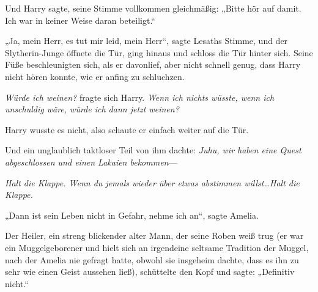 Und Harry sagte, seine Stimme vollkommen gleichmäßig: „Bitte hör auf damit. Ich war in keiner Weise daran beteiligt.“

„Ja, mein Herr, es tut mir leid, mein Herr“, sagte Lesaths Stimme, und der Slytherin-Junge öffnete die Tür, ging hinaus und schloss die Tür hinter sich. Seine Füße beschleunigten sich, als er davonlief, aber nicht schnell genug, dass Harry nicht hören konnte, wie er anfing zu schluchzen.

\emph{Würde ich weinen?} fragte sich Harry. \emph{Wenn ich nichts wüsste, wenn ich unschuldig wäre, würde ich dann jetzt weinen?}

Harry wusste es nicht, also schaute er einfach weiter auf die Tür.

Und ein unglaublich taktloser Teil von ihm dachte: \emph{Juhu, wir haben eine Quest abgeschlossen und einen Lakaien bekommen}—

\emph{Halt die Klappe. Wenn du jemals wieder über etwas abstimmen willst…Halt die Klappe.}


„Dann ist sein Leben nicht in Gefahr, nehme ich an“, sagte Amelia.

Der Heiler, ein streng blickender alter Mann, der seine Roben weiß trug (er war ein Muggelgeborener und hielt sich an irgendeine seltsame Tradition der Muggel, nach der Amelia nie gefragt hatte, obwohl sie insgeheim dachte, dass es ihn zu sehr wie einen Geist aussehen ließ), schüttelte den Kopf und sagte: „Definitiv nicht.“

